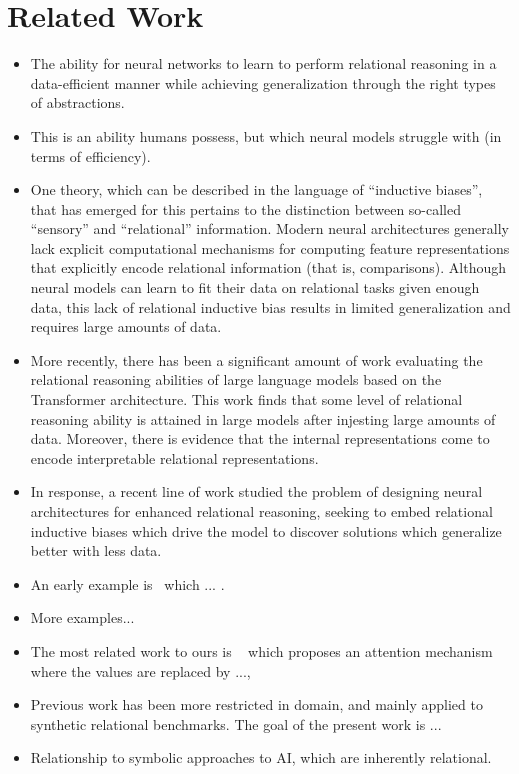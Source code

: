 \section{Related Work}


\begin{itemize}
    \item The ability for neural networks to learn to perform relational reasoning in a data-efficient manner while achieving generalization through the right types of abstractions.
    \item This is an ability humans possess, but which neural models struggle with (in terms of efficiency).
    \item One theory, which can be described in the language of ``inductive biases'', that has emerged for this pertains to the distinction between so-called ``sensory'' and ``relational'' information. Modern neural architectures generally lack explicit computational mechanisms for computing feature representations that explicitly encode relational information (that is, comparisons). Although neural models can learn to fit their data on relational tasks given enough data, this lack of relational inductive bias results in limited generalization and requires large amounts of data.
    \item More recently, there has been a significant amount of work evaluating the relational reasoning abilities of large language models based on the Transformer architecture. This work finds that some level of relational reasoning ability is attained in large models after injesting large amounts of data. Moreover, there is evidence that the internal representations come to encode interpretable relational representations.
    \item In response, a recent line of work studied the problem of designing neural architectures for enhanced relational reasoning, seeking to embed relational inductive biases which drive the model to discover solutions which generalize better with less data.
    \item An early example is~\citep{santoroSimpleNeuralNetwork2017} which ... .
    \item More examples...
    \item The most related work to ours is ~\citep{altabaa2024abstractors} which proposes an attention mechanism where the values are replaced by ..., 
    \item Previous work has been more restricted in domain, and mainly applied to synthetic relational benchmarks. The goal of the present work is ...
    \item Relationship to symbolic approaches to AI, which are inherently relational.
\end{itemize}